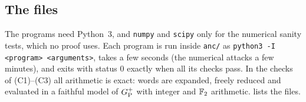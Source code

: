 \subsection{The files}\label{cert:files}

The programs need Python~3, and \texttt{numpy} and \texttt{scipy} only for the numerical sanity tests, which no proof uses. Each program is
run inside \texttt{anc/} as \texttt{python3 -I <program> <arguments>}, takes a few seconds (the numerical attacks a few minutes), and exits
with status $0$ exactly when all its checks pass. In the checks of (C1)--(C3) all arithmetic is exact: words are expanded, freely reduced and evaluated in a faithful model of $G_{\mathrm P}^{+}$ with integer and $\mathbb F_2$ arithmetic.
 lists the files.

\begingroup\small\captionsetup{position=below}
